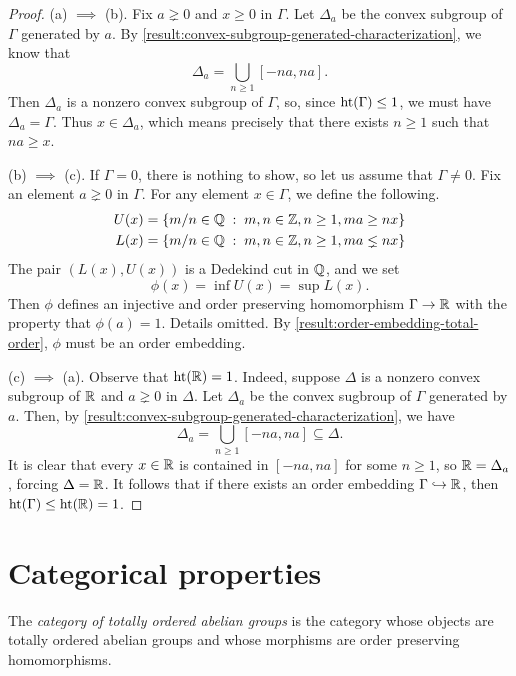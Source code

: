 \begin{proof}
	(a) $\implies$ (b). Fix $a \gneq 0$ and $x \geq 0$ in $\Gamma$. Let $\Delta_a$ be the convex subgroup of $\Gamma$ generated by $a$. By \cref{result:convex-subgroup-generated-characterization}, we know that
	\[ \Delta_a = \bigcup_{n \geq 1} [-na, na]. \]
	Then $\Delta_a$ is a nonzero convex subgroup of $\Gamma$, so, since $\operatorname{ht}(\Gamma) \leq 1$, we must have $\Delta_a = \Gamma$. Thus $x \in \Delta_a$, which means precisely that there exists $n \geq 1$ such that $na \geq x$. 
	
	\medskip
	\noindent
	(b) $\implies$ (c). If $\Gamma = 0$, there is nothing to show, so let us assume that $\Gamma \neq 0$. Fix an element $a \gneq 0$ in $\Gamma$. For any element $x \in \Gamma$, we define the following. 
	\[ \begin{aligned} U(x) &= \{ m/n \in \mathbb{Q} \; : \; m, n \in \mathbb{Z}, n \geq 1, ma \geq nx \} \\
	L(x) &= \{ m/n \in \mathbb{Q} \; : \; m, n \in \mathbb{Z}, n \geq 1, ma \lneq nx \} \end{aligned} \]
	The pair $(L(x),U(x))$ is a Dedekind cut in $\mathbb{Q}$, and we set 
	\[ \phi(x) = \inf U(x) = \sup L(x). \]
	Then $\phi$ defines an injective and order preserving homomorphism $\Gamma \to \mathbb{R}$ with the property that $\phi(a) = 1$. Details omitted. By \cref{result:order-embedding-total-order}, $\phi$ must be an order embedding. 
	
	\medskip
	\noindent
	(c) $\implies$ (a). Observe that $\operatorname{ht}(\mathbb{R}) = 1$. Indeed, suppose $\Delta$ is a nonzero convex subgroup of $\mathbb{R}$ and $a \gneq 0$ in $\Delta$. Let $\Delta_a$ be the convex sugbroup of $\Gamma$ generated by $a$. Then, by \cref{result:convex-subgroup-generated-characterization}, we have
	\[ \Delta_a = \bigcup_{n \geq 1} [-na, na] \subseteq \Delta. \]
	It is clear that every $x \in \mathbb{R}$ is contained in $[-na, na]$ for some $n \geq 1$, so $\mathbb{R} = \Delta_a$, forcing $\Delta = \mathbb{R}$. It follows that if there exists an order embedding $\Gamma \hookrightarrow \mathbb{R}$, then $\operatorname{ht}(\Gamma) \leq \operatorname{ht}(\mathbb{R}) = 1$. 
\end{proof}


\section{Categorical properties}

\begin{definition}
The \emph{category of totally ordered abelian groups} is the category whose objects are totally ordered abelian groups and whose morphisms are order preserving homomorphisms. 
\end{definition}

